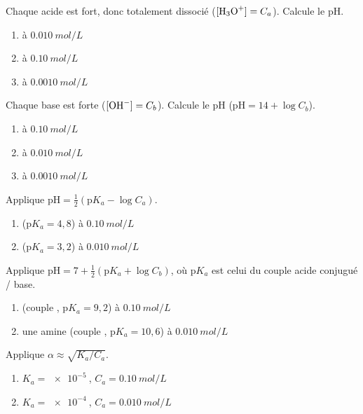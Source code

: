 \documentclass[11pt,a4paper]{article}
\begin{document}

\begin{exo}
Chaque acide est fort, donc totalement dissocié ($[\ce{H3O+}] = C_a$). Calcule le pH.
\begin{enumerate}[label=\alph*)]
  \item {} à $\qty{0,010}{mol\per L}$
  \item {} à $\qty{0,10}{mol\per L}$
  \item {} à $\qty{0,0010}{mol\per L}$
\end{enumerate}
\end{exo}

\begin{exo}
Chaque base est forte ($[\ce{OH-}] = C_b$). Calcule le pH ($\mathrm{pH} = 14 + \log C_b$).
\begin{enumerate}[label=\alph*)]
  \item {} à $\qty{0,10}{mol\per L}$
  \item {} à $\qty{0,010}{mol\per L}$
  \item {} à $\qty{0,0010}{mol\per L}$
\end{enumerate}
\end{exo}

\begin{exo}
Applique $\mathrm{pH} = \tfrac12(\mathrm{p}K_a - \log C_a)$.
\begin{enumerate}[label=\alph*)]
  \item {} ($\mathrm{p}K_a = 4{,}8$) à $\qty{0,10}{mol\per L}$
  \item {} ($\mathrm{p}K_a = 3{,}2$) à $\qty{0,010}{mol\per L}$
\end{enumerate}
\end{exo}

\begin{exo}
Applique $\mathrm{pH} = 7 + \tfrac12(\mathrm{p}K_a + \log C_b)$, où $\mathrm{p}K_a$ est celui du couple
acide conjugué / base.
\begin{enumerate}[label=\alph*)]
  \item {} (couple , $\mathrm{p}K_a = 9{,}2$) à $\qty{0,10}{mol\per L}$
  \item une amine  (couple , $\mathrm{p}K_a = 10{,}6$) à $\qty{0,010}{mol\per L}$
\end{enumerate}
\end{exo}

\begin{exo}
Applique $\alpha \approx \sqrt{K_a/C_a}$.
\begin{enumerate}[label=\alph*)]
  \item $K_a = \qty{e-5}{}$, $C_a = \qty{0,10}{mol\per L}$
  \item $K_a = \qty{e-4}{}$, $C_a = \qty{0,010}{mol\per L}$
\end{enumerate}
\end{exo}
\end{document}

